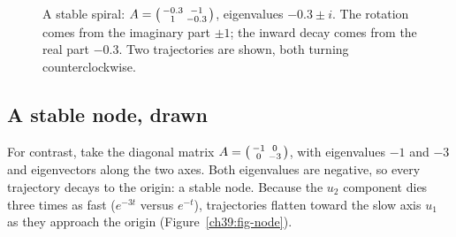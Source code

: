 \begin{figure}[H]
\centering
{}
\caption{A stable spiral: $A=\protect\begin{psmallmatrix} -0.3 & -1 \\ 1 &
-0.3\protect\end{psmallmatrix}$, eigenvalues $-0.3\pm i$. The rotation comes from the
imaginary part $\pm 1$; the inward decay comes from the real part $-0.3$. Two
trajectories are shown, both turning counterclockwise.}
\label{ch39:fig-spiral}
\end{figure}

\subsection{A stable node, drawn}

For contrast, take the diagonal matrix
$A = \begin{psmallmatrix} -1 & 0 \\ 0 & -3\end{psmallmatrix}$, with eigenvalues
$-1$ and $-3$ and eigenvectors along the two axes. Both eigenvalues are negative,
so every trajectory decays to the origin: a stable node. Because the $u_2$
component dies three times as fast ($e^{-3t}$ versus $e^{-t}$), trajectories flatten
toward the slow axis $u_1$ as they approach the origin
(Figure~\ref{ch39:fig-node}).

